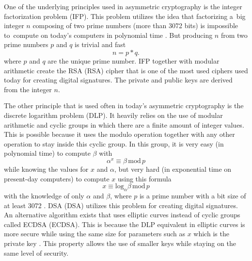One of the underlying principles used in asymmetric cryptography is the integer factorization problem (\acs{IFP}). This problem utilizes the idea that factorizing a~big integer $n$ composing of two prime numbers (more than 3072 bits) is impossible to~compute on today's computers in polynomial time \cite{Paar2010}. But producing $n$ from two prime numbers $p$ and $q$ is trivial and fast
\begin{equation}
  n=p*q.
\end{equation}
where $p$ and $q$ are the unique prime number. IFP together with modular arithmetic create the RSA (\acl{RSA}) cipher that is one of the most used ciphers used today for creating digital signatures. The private and public keys are derived from the integer $n$.

The other principle that is used often in today's asymmetric cryptography is the discrete logarithm problem (\acs{DLP}). It heavily relies on the use of modular arithmetic and cyclic groups in which there are a finite amount of integer values. This is possible because it uses the modulo operation together with any other operation to stay inside this cyclic group. In this group, it is very easy (in polynomial time) to compute $\beta$ with
\begin{equation}
  \alpha^x\equiv\beta\,\mathrm{mod}\,p
\end{equation}
while knowing the values for $x$ and $\alpha$, but very hard (in exponential time on present-day computers) to compute $x$ using this formula
\begin{equation}
  x\equiv\mathrm{log}_\alpha\beta\,\mathrm{mod}\,p
\end{equation}
with the knowledge of only $\alpha$ and $\beta$, where $p$ is a prime number with a bit size of at least 3072 \cite{Paar2010}. DSA (\acl{DSA}) utilizes this problem for creating digital signatures. An alternative algorithm exists that uses elliptic curves instead of cyclic groups called ECDSA (\acl{ECDSA}). This is because the DLP equivalent in elliptic curves is more secure while using the same size for parameters such as $x$ which is the private key \cite{Ristic2014}. This property allows the use of smaller keys while staying on the same level of security.
